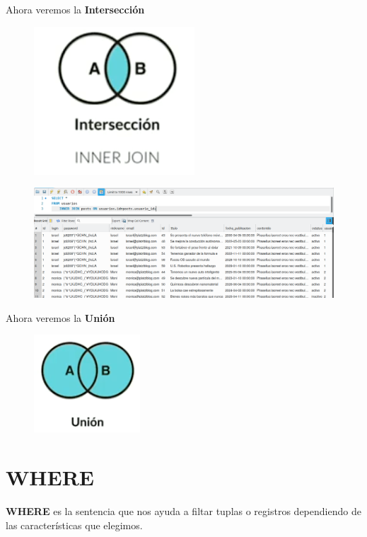 \documentclass{article}
\begin{document}
Ahora veremos la \textbf{Intersección}\\
\begin{figure}[h!]
  \centering
  \includegraphics[scale=0.75]{./Pictures/096_Interseccion.png}
\end{figure}

\begin{figure}[h!]
  \centering
  \includegraphics[scale=0.75]{./Pictures/099_inner.png}
\end{figure}


Ahora veremos la \textbf{Unión}

\begin{figure}[h!]
  \centering
  \includegraphics[scale=0.75]{./Pictures/097_union.png}
\end{figure}


\section{WHERE}%
\textbf{WHERE} es la sentencia que nos ayuda a filtar tuplas o registros
dependiendo de las características que elegimos.
\end{document}
